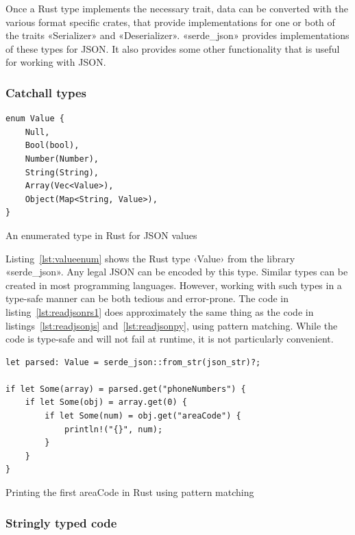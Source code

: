 Once a Rust type implements the necessary trait, data can be converted with the various format specific crates, that provide implementations for one or both of the traits «Serializer» and «Deserializer». «serde_json» provides implementations of these types for JSON. It also provides some other functionality that is useful for working with JSON.

\subsubsection{Catchall types}

\begin{listing}[ht!]
\begin{verbatim}
enum Value {
    Null,
    Bool(bool),
    Number(Number),
    String(String),
    Array(Vec<Value>),
    Object(Map<String, Value>),
}
\end{verbatim}
\caption{An enumerated type in Rust for JSON values}
\label{lst:valueenum}
\end{listing}

Listing~\ref{lst:valueenum} shows the Rust type ‹Value› from the library «serde_json». Any legal JSON can be encoded by this type. Similar types can be created in most programming languages. However, working with such types in a type-safe manner can be both tedious and error-prone. The code in listing~\ref{lst:readjsonrs1} does approximately the same thing as the code in listings~\ref{lst:readjsonjs} and~\ref{lst:readjsonpy}, using pattern matching. While the code is type-safe and will not fail at runtime, it is not particularly convenient.

\begin{listing}[ht!]
\begin{verbatim}
let parsed: Value = serde_json::from_str(json_str)?;

if let Some(array) = parsed.get("phoneNumbers") {
    if let Some(obj) = array.get(0) {
        if let Some(num) = obj.get("areaCode") {
            println!("{}", num);
        }
    }
}
\end{verbatim}
\caption{Printing the first areaCode in Rust using pattern matching}
\label{lst:readjsonrs1}
\end{listing}


\subsubsection{Stringly typed code}

